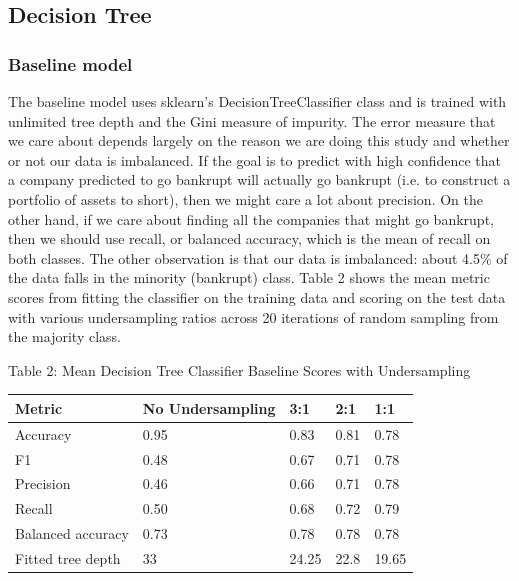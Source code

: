 \documentclass{article}
\begin{document}
\subsection{Decision Tree}

\subsubsection*{Baseline model}

The baseline model uses sklearn's DecisionTreeClassifier class and is trained with unlimited tree depth and the Gini measure of impurity. The error measure that we care about depends largely on the reason we are doing this study and whether or not our data is imbalanced. If the goal is to predict with high confidence that a company predicted to go bankrupt will actually go bankrupt (i.e. to construct a portfolio of assets to short), then we might care a lot about precision. On the other hand, if we care about finding all the companies that might go bankrupt, then we should use recall, or balanced accuracy, which is the mean of recall on both classes. The other observation is that our data is imbalanced: about 4.5\% of the data falls in the minority (bankrupt) class. Table 2 shows the mean metric scores from fitting the classifier on the training data and scoring on the test data with various undersampling ratios across 20 iterations of random sampling from the majority class.

\begin{table}
	\centering
	Table 2: Mean Decision Tree Classifier Baseline Scores with Undersampling
	\begin{tabular}{ l l l l l }
		\hline
		Metric & No Undersampling\footnote[1] & 3:1 \footnote[2] & 2:1 & 1:1 \\
		\hline
		Accuracy & 0.95 & 0.83 & 0.81 & 0.78 \\
		F1 & 0.48 & 0.67 & 0.71 & 0.78 \\
		Precision & 0.46 & 0.66 & 0.71 & 0.78 \\
		Recall & 0.50 & 0.68 & 0.72 & 0.79 \\
		Balanced accuracy & 0.73 & 0.78 & 0.78 & 0.78 \\
		Fitted tree depth & 33 & 24.25 & 22.8 & 19.65\\
		\hline 
		

	\end{tabular}
\end{table}
\end{document}
